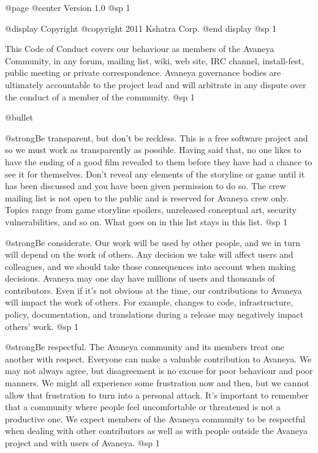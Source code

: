 @page
@center Version 1.0
@sp 1


@display
Copyright @copyright{} 2011 Kshatra Corp.
@end display
@sp 1

This Code of Conduct covers our behaviour as members of the Avaneya
Community, in any forum, mailing list, wiki, web site, IRC channel,
install-fest, public meeting or private correspondence. Avaneya
governance bodies are ultimately accountable to the project lead and
will arbitrate in any dispute over the conduct of a member of the
community.
@sp 1

\itemize @bullet
\item
@strong{Be transparent, but don't be reckless.} This is a free
software project and so we must work as transparently as possible.
Having said that, no one likes to have the ending of a good film
revealed to them before they have had a chance to see it for
themselves. Don't reveal any elements of the storyline or game until
it has been discussed and you have been given permission to do so. The
crew mailing list is not open to the public and is reserved for
Avaneya crew only. Topics range from game storyline spoilers,
unreleased conceptual art, security vulnerabilities, and so on. What
goes on in this list stays in this list.
@sp 1

\item
@strong{Be considerate.} Our work will be used by other people, and we
in turn will depend on the work of others. Any decision we take will
affect users and colleagues, and we should take those consequences
into account when making decisions. Avaneya may one day have millions
of users and thousands of contributors. Even if it's not obvious at
the time, our contributions to Avaneya will impact the work of others.
For example, changes to code, infrastructure, policy, documentation,
and translations during a release may negatively impact others' work.
@sp 1

\item
@strong{Be respectful.} The Avaneya community and its members treat one
another with respect. Everyone can make a valuable contribution to
Avaneya. We may not always agree, but disagreement is no excuse for
poor behaviour and poor manners. We might all experience some
frustration now and then, but we cannot allow that frustration to turn
into a personal attack. It's important to remember that a community
where people feel uncomfortable or threatened is not a productive one.
We expect members of the Avaneya community to be respectful when
dealing with other contributors as well as with people outside the
Avaneya project and with users of Avaneya.
@sp 1


